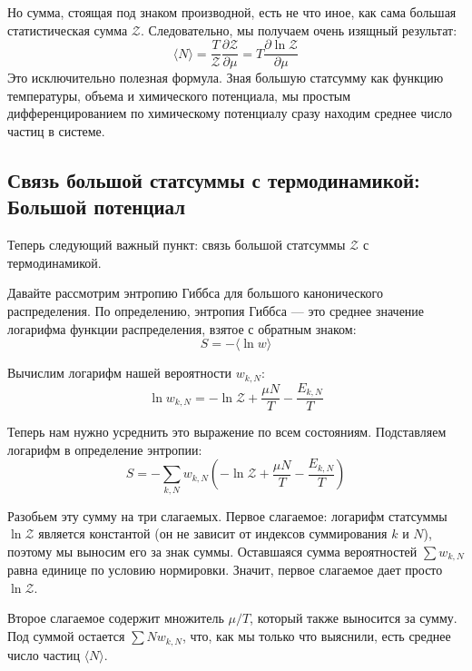 \documentclass[../general/general]{subfiles}
\begin{document}
Но сумма, стоящая под знаком производной, есть не что иное, как сама большая статистическая сумма $\mathcal{Z}$. Следовательно, мы получаем очень изящный результат:
\begin{equation}
    \langle N \rangle = \frac{T}{\mathcal{Z}} \frac{\partial \mathcal{Z}}{\partial \mu} = T \frac{\partial \ln \mathcal{Z}}{\partial \mu}
    \label{eq:mean_N_derivative}
\end{equation}
Это исключительно полезная формула. Зная большую статсумму как функцию температуры, объема и химического потенциала, мы простым дифференцированием по химическому потенциалу сразу находим среднее число частиц в системе.

\subsection{Связь большой статсуммы с термодинамикой: Большой потенциал}

Теперь следующий важный пункт: связь большой статсуммы $\mathcal{Z}$ с термодинамикой. 

Давайте рассмотрим энтропию Гиббса для большого канонического распределения. По определению, энтропия Гиббса — это среднее значение логарифма функции распределения, взятое с обратным знаком:
\begin{equation*}
    S = -\langle \ln w \rangle
\end{equation*}

Вычислим логарифм нашей вероятности $w_{k, N}$:
\begin{equation*}
    \ln w_{k, N} = -\ln \mathcal{Z} + \frac{\mu N}{T} - \frac{E_{k, N}}{T}
\end{equation*}

Теперь нам нужно усреднить это выражение по всем состояниям. Подставляем логарифм в определение энтропии:
\begin{equation*}
    S = - \sum_{k, N} w_{k, N} \left( -\ln \mathcal{Z} + \frac{\mu N}{T} - \frac{E_{k, N}}{T} \right)
\end{equation*}

Разобьем эту сумму на три слагаемых. 
Первое слагаемое: логарифм статсуммы $\ln \mathcal{Z}$ является константой (он не зависит от индексов суммирования $k$ и $N$), поэтому мы выносим его за знак суммы. Оставшаяся сумма вероятностей $\sum w_{k, N}$ равна единице по условию нормировки. Значит, первое слагаемое дает просто $\ln \mathcal{Z}$.

Второе слагаемое содержит множитель $\mu / T$, который также выносится за сумму. Под суммой остается $\sum N w_{k, N}$, что, как мы только что выяснили, есть среднее число частиц $\langle N \rangle$.
\end{document}
